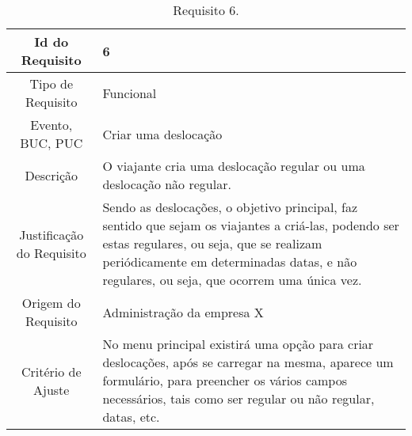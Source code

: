 \begin{table}[H]
\begin{center}
  \begin{tabularx}{\textwidth}{ | c | X | }
    \hline
    Id do Requisito & 6  \\
    
    \hline
    Tipo de Requisito & Funcional \\
    
    \hline
    Evento, BUC, PUC &  Criar uma deslocação\\
    
    \hline
    Descrição & O viajante cria uma deslocação regular ou uma deslocação não regular. \\
    
    \hline
    Justificação do Requisito & Sendo as deslocações, o objetivo principal, faz sentido que sejam os viajantes a criá-las, podendo ser estas regulares, ou seja, que se realizam periódicamente em determinadas datas, e não regulares, ou seja, que ocorrem uma única vez.  \\
    
    \hline
    Origem do Requisito & Administração da empresa X \\
    
    \hline
    Critério de Ajuste & No menu principal existirá uma opção para criar deslocações, após se carregar na mesma, aparece um formulário, para preencher os vários campos necessários, tais como ser regular ou não regular, datas, etc.\\
    
    \hline
  \end{tabularx}
  \caption{Requisito 6.} \label{tab:r3}
\end{center}
\end{table}



